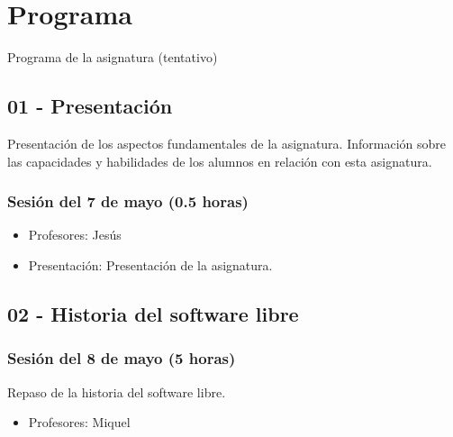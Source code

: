 \documentclass[a4paper,12pt]{article}
\begin{document}
\section{Programa}

Programa de la asignatura (tentativo)

\subsection{01 - Presentación}

Presentación de los aspectos fundamentales de la asignatura. Información sobre las capacidades y habilidades de los alumnos en relación con esta asignatura.

\subsubsection{Sesión del 7 de mayo (0.5 horas)}

\begin{itemize}
\item Profesores: Jesús
\item Presentación: Presentación de la asignatura.
\end{itemize}

\subsection{02 - Historia del software libre}

\subsubsection{Sesión del 8 de mayo (5 horas)}

Repaso de la historia del software libre.

\begin{itemize}
\item Profesores: Miquel
\end{itemize}


\end{document}
